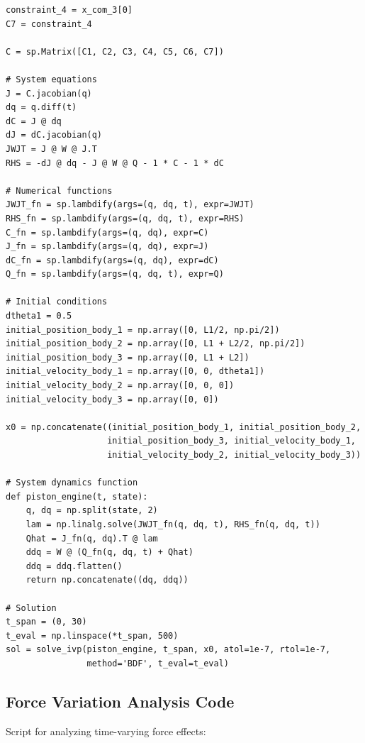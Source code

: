 \documentclass[10pt]{article}
\begin{document}
\begin{verbatim}
constraint_4 = x_com_3[0]
C7 = constraint_4

C = sp.Matrix([C1, C2, C3, C4, C5, C6, C7])

# System equations
J = C.jacobian(q)     
dq = q.diff(t)        
dC = J @ dq
dJ = dC.jacobian(q)
JWJT = J @ W @ J.T
RHS = -dJ @ dq - J @ W @ Q - 1 * C - 1 * dC

# Numerical functions
JWJT_fn = sp.lambdify(args=(q, dq, t), expr=JWJT)
RHS_fn = sp.lambdify(args=(q, dq, t), expr=RHS)
C_fn = sp.lambdify(args=(q, dq), expr=C)    
J_fn = sp.lambdify(args=(q, dq), expr=J)   
dC_fn = sp.lambdify(args=(q, dq), expr=dC)  
Q_fn = sp.lambdify(args=(q, dq, t), expr=Q)

# Initial conditions
dtheta1 = 0.5
initial_position_body_1 = np.array([0, L1/2, np.pi/2])
initial_position_body_2 = np.array([0, L1 + L2/2, np.pi/2])
initial_position_body_3 = np.array([0, L1 + L2])
initial_velocity_body_1 = np.array([0, 0, dtheta1])
initial_velocity_body_2 = np.array([0, 0, 0])
initial_velocity_body_3 = np.array([0, 0])

x0 = np.concatenate((initial_position_body_1, initial_position_body_2, 
                    initial_position_body_3, initial_velocity_body_1, 
                    initial_velocity_body_2, initial_velocity_body_3))

# System dynamics function
def piston_engine(t, state):
    q, dq = np.split(state, 2)
    lam = np.linalg.solve(JWJT_fn(q, dq, t), RHS_fn(q, dq, t))
    Qhat = J_fn(q, dq).T @ lam
    ddq = W @ (Q_fn(q, dq, t) + Qhat)
    ddq = ddq.flatten()
    return np.concatenate((dq, ddq))

# Solution
t_span = (0, 30)
t_eval = np.linspace(*t_span, 500)
sol = solve_ivp(piston_engine, t_span, x0, atol=1e-7, rtol=1e-7, 
                method='BDF', t_eval=t_eval)
\end{verbatim}

\subsection{Force Variation Analysis Code}

Script for analyzing time-varying force effects:
\end{document}
